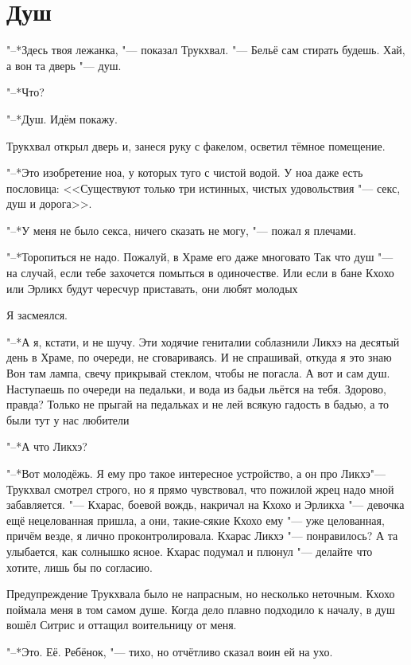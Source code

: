 \section{Душ}

"--*Здесь твоя лежанка, "--- показал Трукхвал.
"--- Бельё сам стирать будешь.
Хай, а вон та дверь "--- душ.

"--*Что?

"--*Душ.
Идём покажу.

Трукхвал открыл дверь и, занеся руку с факелом, осветил тёмное помещение.

"--*Это изобретение ноа, у которых туго с чистой водой.
У ноа даже есть пословица: <<Существуют только три истинных, чистых удовольствия "--- секс, душ и дорога>>.

"--*У меня не было секса, ничего сказать не могу, "--- пожал я плечами.

"--*Торопиться не надо.
Пожалуй, в Храме его даже многовато\ldotst
Так что душ "--- на случай, если тебе захочется помыться в одиночестве.
Или если в бане Кхохо или Эрликх будут чересчур приставать, они любят молодых\ldotst

Я засмеялся.

"--*А я, кстати, и не шучу.
Эти ходячие гениталии соблазнили Ликхэ на десятый день в Храме, по очереди, не сговариваясь.
И не спрашивай, откуда я это знаю\ldotst
Вон там лампа, свечу прикрывай стеклом, чтобы не погасла.
А вот и сам душ.
Наступаешь по очереди на педальки, и вода из бадьи льётся на тебя.
Здорово, правда?
Только не прыгай на педальках и не лей всякую гадость в бадью, а то были тут у нас любители\ldotst

"--*А что Ликхэ?

"--*Вот молодёжь.
Я ему про такое интересное устройство, а он про Ликхэ\ldotst "--- Трукхвал смотрел строго, но я прямо чувствовал, что пожилой жрец надо мной забавляется.
"--- Кхарас, боевой вождь, накричал на Кхохо и Эрликха "--- девочка ещё нецелованная пришла, а они, такие-сякие\ldotst
Кхохо ему "--- уже целованная, причём везде, я лично проконтролировала.
Кхарас Ликхэ "--- понравилось?
А та улыбается, как солнышко ясное.
Кхарас подумал и плюнул "--- делайте что хотите, лишь бы по согласию.

\razd

Предупреждение Трукхвала было не напрасным, но несколько неточным.
Кхохо поймала меня в том самом душе.
Когда дело плавно подходило к началу, в душ вошёл Ситрис и оттащил воительницу от меня.

"--*Это. Её. Ребёнок, "--- тихо, но отчётливо сказал воин ей на ухо.


